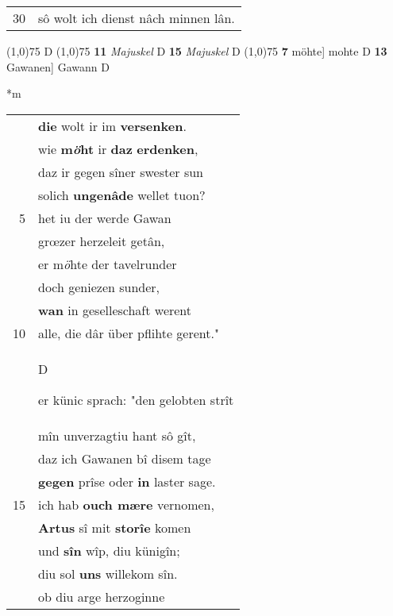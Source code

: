 \documentclass[8pt,a4paper,notitlepage]{article}
\begin{document}
\begin{table}[ht]
\begin{minipage}[t]{0.5\linewidth}
\begin{tabular}{rl}
30 & sô wolt ich dienst nâch minnen lân.\\ 
\end{tabular}
\scriptsize
\line(1,0){75} \newline
D \newline
\line(1,0){75} \newline
\textbf{11} \textit{Majuskel} D  \textbf{15} \textit{Majuskel} D  \newline
\line(1,0){75} \newline
\textbf{7} möhte] mohte D \textbf{13} Gawanen] Gawann D \newline
\end{minipage}
\hspace{0.5cm}
\begin{minipage}[t]{0.5\linewidth}
\small
\begin{center}*m
\end{center}
\begin{tabular}{rl}
 & \textbf{die} wolt ir im \textbf{versenken}.\\ 
 & wie \textbf{m\textit{ö}ht} ir \textbf{daz} \textbf{erdenken},\\ 
 & daz ir gegen sîner swester sun\\ 
 & solich \textbf{ungenâde} wellet tuon?\\ 
5 & het iu der werde Gawan\\ 
 & grœzer herzeleit getân,\\ 
 & er m\textit{ö}hte der tavelrunder\\ 
 & doch geniezen sunder,\\ 
 & \textbf{wan} in geselleschaft werent\\ 
10 & alle, die dâr über pflihte gerent."\\ 
 & \begin{large}D\end{large}er künic sprach: "den gelobten strît\\ 
 & mîn unverzagtiu hant sô gît,\\ 
 & daz ich Gawanen bî disem tage\\ 
 & \textbf{gegen} prîse oder \textbf{in} laster sage.\\ 
15 & ich hab \textbf{ouch mære} vernomen,\\ 
 & \textbf{Artus} sî mit \textbf{storîe} komen\\ 
 & und \textbf{sîn} wîp, diu künigîn;\\ 
 & diu sol \textbf{uns} willekom sîn.\\ 
 & ob diu arge herzoginne\\ 

\end{tabular}
\end{minipage}
\end{table}
\end{document}
